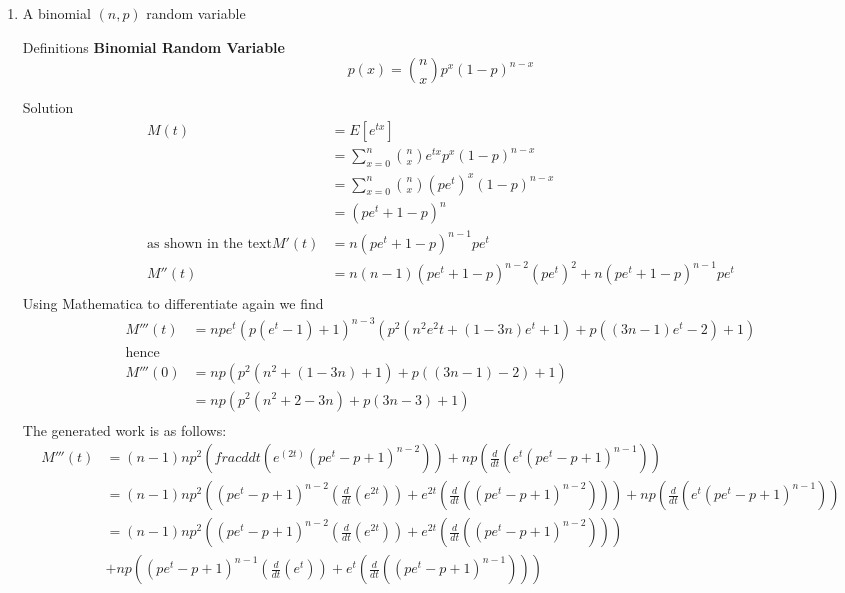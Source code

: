 \documentclass{article}
\begin{document}
\begin{spacing}{1.1}
\begin{homeworkProblem}
  \begin{enumerate}[(1)]
    \item A binomial $(n, p)$ random variable
      \begin{homeworkSection}{Definitions}
        {\bf Binomial Random Variable}
          \[p( x) = {n \choose x} p^x (1 - p)^{n - x}\]
      \end{homeworkSection}
      \begin{homeworkSection}{Solution}
       \begin{align*}
          M( t) &= E[ e^{tx}]\\
          &= \sum\limits_{ x = 0}^n {n \choose x} e^{tx} p^x (1 - p)^{n - x}\\
          &= \sum\limits_{ x = 0}^n {n \choose x} (p e^t)^x (1 - p)^{n - x}\\
          &= (p e^t + 1 -p)^n\\
          \text{as shown in the text}
          M'( t) &= n (p e^t + 1 - p)^{n - 1} p e^t\\
          M''( t) &= n (n - 1) (p e^t + 1 - p)^{n - 2} (p e^t)^2 + n (p e^t + 1 - p)^{n - 1} p e^t\\
        \end{align*}
        Using Mathematica to differentiate again we find
        \begin{align*}
          M'''( t) 
            &= n p e^t (p (e^t  -  1)  +  1)^{n  -  3} (p^2 (n^2 e^2t  +  (1  -  3 n) e^t  +  1) +  p ((3n  -  1) e^t  - 2)  +  1)\\
          \text{hence}\\
          M'''( 0)
            &= np (p^2 (n^2 + (1 - 3n) + 1) + p (( 3n - 1) - 2) +1 )\\
            &= np (p^2 (n^2 + 2 - 3n ) + p (3n - 3) + 1 )\\
        \end{align*}
        The generated work is as follows:
        \begin{align*}
          M'''( t) & = (n-1) n p^2 (frac{ d}{ dt}(e^{(2 t)} (p e^t - p+1)^{n - 2})) 
            + n p (\frac{ d}{ dt} (e^t (p e^t - p+1)^{n - 1} ))\\
            &=  (n - 1) n p^2 ((p e^t - p+1)^{n - 2}  (\frac{ d}{ dt} (e^{2 t} )) + e^{2 t}  (\frac{ d}{ dt} ((p e^t - p+1)^{n - 2} ))) + n p (\frac{ d}{ dt} (e^t (p e^t - p+1)^{n - 1} ))\\
          &= (n - 1) n p^2 ((p e^t - p+1)^{n - 2}  (\frac{ d}{ dt} (e^{2 t} )) + e^{2 t}  (\frac{ d}{ dt} ((p e^t - p+1)^{n - 2} ))) 
            \\&+ n p ((p e^t - p+1)^{n - 1}  (\frac{ d}{ dt} (e^t)) + e^t (\frac{ d}{ dt} ((p e^t - p+1)^{n - 1} )))\\

\end{align*}
\end{homeworkSection}
\end{enumerate}
\end{homeworkProblem}
\end{spacing}
\end{document}
